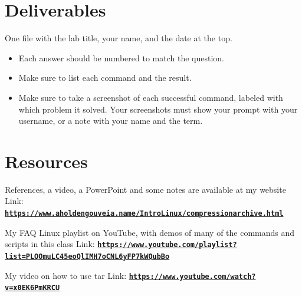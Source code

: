 \documentclass[12pt]{article}
\begin{document}
\section*{Deliverables}
One file with the lab title, your name, and the date at the top.
\begin{itemize}
    \item Each answer should be numbered to match the question.
    \item Make sure to list each command and the result.
    \item Make sure to take a screenshot of each successful command, labeled with which problem it solved. Your screenshots must show your prompt with your username, or a note with your name and the term.
\end{itemize}

\section*{Resources}
References, a video, a PowerPoint and some notes are available at my website
Link: \href{https://www.aholdengouveia.name/IntroLinux/compressionarchive.html}{\textbf{\nolinkurl{https://www.aholdengouveia.name/IntroLinux/compressionarchive.html}}}

My FAQ Linux playlist on YouTube, with demos of many of the commands and scripts in this class
Link: \href{https://www.youtube.com/playlist?list=PLQOmuLC45eoQlIMH7oCNL6yFP7kWQubBo}{\textbf{\nolinkurl{https://www.youtube.com/playlist?list=PLQOmuLC45eoQlIMH7oCNL6yFP7kWQubBo}}}

My video on how to use tar
Link: \href{https://www.youtube.com/watch?v=x0EK6PmKRCU}{\textbf{\nolinkurl{https://www.youtube.com/watch?v=x0EK6PmKRCU}}}
\end{document}

